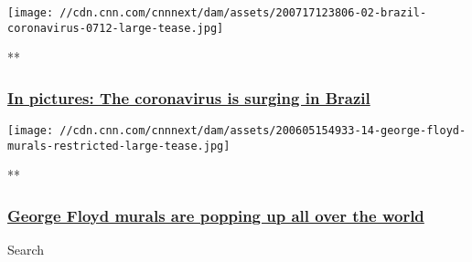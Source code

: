 \href{/2020/05/22/americas/gallery/brazil-coronavirus/index.html}{}

\texttt{[image: //cdn.cnn.com/cnnnext/dam/assets/200717123806-02-brazil-coronavirus-0712-large-tease.jpg]}

**

\hypertarget{in-pictures-the-coronavirus-is-surging-in-brazil}{%
\subsubsection{\texorpdfstring{\href{/2020/05/22/americas/gallery/brazil-coronavirus/index.html}{In
pictures: The coronavirus is surging in
Brazil}}{In pictures: The coronavirus is surging in Brazil}}\label{in-pictures-the-coronavirus-is-surging-in-brazil}}

\href{/2020/06/06/world/gallery/george-floyd-murals-trnd/index.html}{}

\texttt{[image: //cdn.cnn.com/cnnnext/dam/assets/200605154933-14-george-floyd-murals-restricted-large-tease.jpg]}

**

\hypertarget{george-floyd-murals-are-popping-up-all-over-the-world}{%
\subsubsection{\texorpdfstring{\href{/2020/06/06/world/gallery/george-floyd-murals-trnd/index.html}{George
Floyd murals are popping up all over the
world}}{George Floyd murals are popping up all over the world}}\label{george-floyd-murals-are-popping-up-all-over-the-world}}

Search

